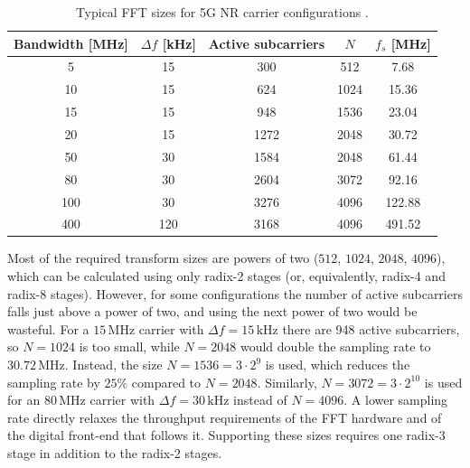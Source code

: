\documentclass[a4paper,12pt, master]{etf}
\begin{document}
\begin{table}[htb]
\centering
\caption{Typical FFT sizes for 5G NR carrier configurations \cite{18}.}
\medskip
\label{tab:nr_fft_sizes}
\begin{tabular}{c | c | c | c | c}
\hline
Bandwidth [MHz] & $\Delta f$ [kHz] & Active subcarriers & $N$ & $f_s$ [MHz]\\
\hline
\hline
5 & 15 & 300 & 512 & 7.68\\
\hline
10 & 15 & 624 & 1024 & 15.36\\
\hline
15 & 15 & 948 & 1536 & 23.04\\
\hline
20 & 15 & 1272 & 2048 & 30.72\\
\hline
50 & 30 & 1584 & 2048 & 61.44\\
\hline
80 & 30 & 2604 & 3072 & 92.16\\
\hline
100 & 30 & 3276 & 4096 & 122.88\\
\hline
400 & 120 & 3168 & 4096 & 491.52\\
\hline
\end{tabular}
\end{table}

Most of the required transform sizes are powers of two ($512$, $1024$, $2048$, $4096$), which can be calculated using only radix-2 stages (or, equivalently, radix-4 and radix-8 stages). However, for some configurations the number of active subcarriers falls just above a power of two, and using the next power of two would be wasteful. For a $15\,\mathrm{MHz}$ carrier with $\Delta f = 15\,\mathrm{kHz}$ there are 948 active subcarriers, so $N = 1024$ is too small, while $N = 2048$ would double the sampling rate to $30.72\,\mathrm{MHz}$. Instead, the size $N = 1536 = 3 \cdot 2^9$ is used, which reduces the sampling rate by $25\%$ compared to $N = 2048$. Similarly, $N = 3072 = 3 \cdot 2^{10}$ is used for an $80\,\mathrm{MHz}$ carrier with $\Delta f = 30\,\mathrm{kHz}$ instead of $N = 4096$. A lower sampling rate directly relaxes the throughput requirements of the FFT hardware and of the digital front-end that follows it. Supporting these sizes requires one radix-3 stage in addition to the radix-2 stages.
\end{document}
